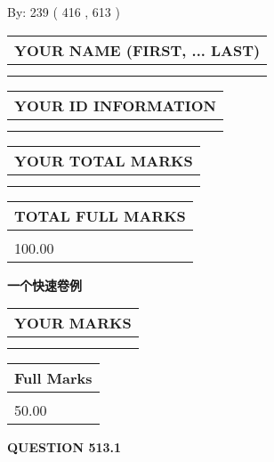 \documentclass{ctexart}
\begin{document}
   
\hspace{1.0in} By: 
 239 ( 416 ,  613 )
   
   
   
   
\newpage 
\setcounter{page}{ 
   513001 } 
   
   
   
   
\noindent\begin{tabular}{|l|}
\hline
YOUR NAME (FIRST, ... LAST)  \\
\hline
 \\ 
 \\ 
\hline
\end{tabular}
\hspace{0.05in} \begin{tabular}{|l|}
\hline
 YOUR   ID   INFORMATION  \\
\hline
 \\ 
 \\ 
\hline
\end{tabular}
   
   
\vspace{0.2in}\noindent\begin{tabular}{|l|}
\hline
YOUR TOTAL MARKS  \\
\hline
 \\ 
 \\ 
\hline
\end{tabular}
\hspace{0.05in} \begin{tabular}{|l|}
\hline
TOTAL FULL MARKS  \\
\hline
 \\ 
100.00 \\
\hline
\end{tabular}
   
   
 \vspace{0.2in}
{\LARGE {\textbf{ 一个快速卷例}}}
   
   
  
\vspace{0.2in}
  
\noindent\begin{tabular}{|l|}
\hline
 YOUR MARKS  \\
\hline
 \\ 
 \\ 
\hline
\end{tabular}
\hspace{0.05in} \begin{tabular}{|l|}
\hline
 Full Marks  \\
\hline
 \\ 
50.00 \\
\hline
\end{tabular}
{\textbf{\Large{QUESTION
513.1 
}}}
  
\end{document}
